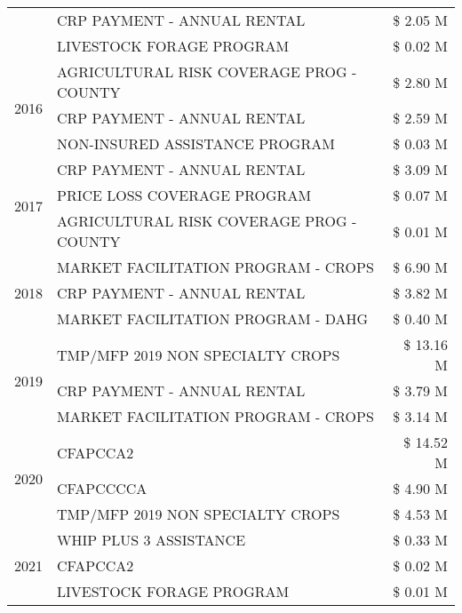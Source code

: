 \begin{tabular}{llr}
 & CRP PAYMENT - ANNUAL RENTAL & \$ 2.05 M \\
 & LIVESTOCK FORAGE PROGRAM & \$ 0.02 M \\
\cline{1-3}
\multirow[t]{3}{*}{2016} & AGRICULTURAL RISK COVERAGE PROG - COUNTY & \$ 2.80 M \\
 & CRP PAYMENT - ANNUAL RENTAL & \$ 2.59 M \\
 & NON-INSURED ASSISTANCE PROGRAM & \$ 0.03 M \\
\cline{1-3}
\multirow[t]{3}{*}{2017} & CRP PAYMENT - ANNUAL RENTAL & \$ 3.09 M \\
 & PRICE LOSS COVERAGE PROGRAM & \$ 0.07 M \\
 & AGRICULTURAL RISK COVERAGE PROG - COUNTY & \$ 0.01 M \\
\cline{1-3}
\multirow[t]{3}{*}{2018} & MARKET FACILITATION PROGRAM - CROPS & \$ 6.90 M \\
 & CRP PAYMENT - ANNUAL RENTAL & \$ 3.82 M \\
 & MARKET FACILITATION PROGRAM - DAHG & \$ 0.40 M \\
\cline{1-3}
\multirow[t]{3}{*}{2019} & TMP/MFP 2019 NON SPECIALTY CROPS & \$ 13.16 M \\
 & CRP PAYMENT - ANNUAL RENTAL & \$ 3.79 M \\
 & MARKET FACILITATION PROGRAM - CROPS & \$ 3.14 M \\
\cline{1-3}
\multirow[t]{3}{*}{2020} & CFAPCCA2 & \$ 14.52 M \\
 & CFAPCCCCA & \$ 4.90 M \\
 & TMP/MFP 2019 NON SPECIALTY CROPS & \$ 4.53 M \\
\cline{1-3}
\multirow[t]{3}{*}{2021} & WHIP PLUS 3 ASSISTANCE & \$ 0.33 M \\
 & CFAPCCA2 & \$ 0.02 M \\
 & LIVESTOCK FORAGE PROGRAM & \$ 0.01 M \\
\cline{1-3}
\bottomrule
\end{tabular}
